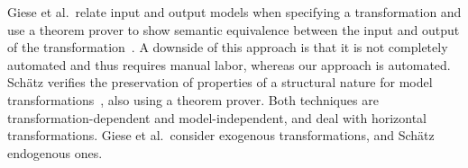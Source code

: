 Giese et al.\ relate input and output models when specifying a transformation and use a theorem prover to show semantic equivalence between the input and output of the transformation~\cite{Giese06towardsverified}.
A downside of this approach is that it is not completely automated and thus requires manual labor, whereas our approach is automated.
Sch{\"a}tz verifies the preservation of properties of a structural nature for model transformations~\cite{Schatz10}, also using a theorem prover.
Both techniques are transformation-dependent and model-independent, and deal with horizontal transformations.
Giese et al.\ consider exogenous transformations, and Sch{\"a}tz endogenous ones.
